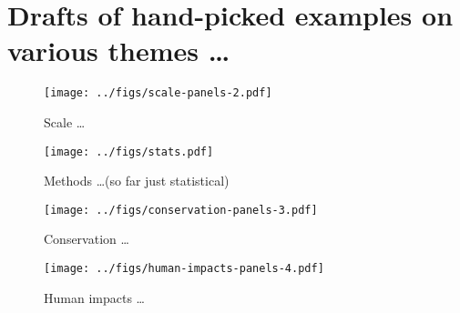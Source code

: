 \documentclass[12pt]{article}
\begin{document}
\clearpage

\section*{Drafts of hand-picked examples on various themes \ldots}

\begin{figure}[htbp]
\centering
\texttt{[image: ../figs/scale-panels-2.pdf]}
\caption{Scale \ldots}
\end{figure}

\clearpage


\begin{figure}[htbp]
\centering
\texttt{[image: ../figs/stats.pdf]}
\caption{Methods \ldots (so far just statistical)}
\end{figure}

\clearpage


\begin{figure}[htbp]
\centering
\texttt{[image: ../figs/conservation-panels-3.pdf]}
\caption{Conservation \ldots}
\end{figure}

\clearpage

\begin{figure}[htbp]
\centering
\texttt{[image: ../figs/human-impacts-panels-4.pdf]}
\caption{Human impacts \ldots}
\end{figure}


\end{document}
